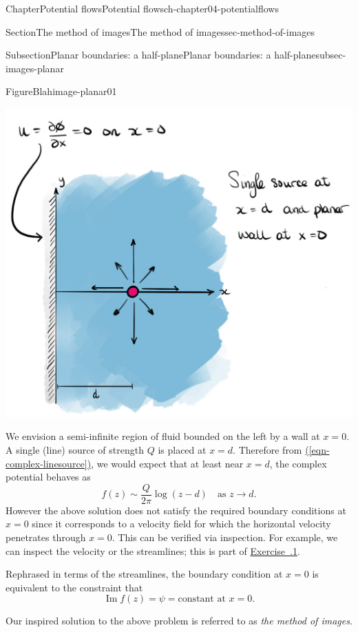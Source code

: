 \documentclass[oneside,10pt,]{book}
\newcommand{\xreffont}{\relax}
\numberwithin{equation}{section}
\renewcommand*{\Im}{\operatorname{Im}}
\begin{document}
\begin{chapterptx}{Chapter}{Potential flows}{}{Potential flows}{}{}{ch-chapter04-potentialflows}
\begin{sectionptx}{Section}{The method of images}{}{The method of images}{}{}{sec-method-of-images}
\begin{subsectionptx}{Subsection}{Planar boundaries: a half-plane}{}{Planar boundaries: a half-plane}{}{}{subsec-images-planar}
\begin{figureptx}{Figure}{Blah}{image-planar01}{}
\begin{image}{0.1}{0.8}{0.1}{}
\includegraphics[width=\linewidth]{external/image-planar01.jpg}
\end{image}%
\tcblower
\end{figureptx}%
We envision a semi-infinite region of fluid bounded on the left by a wall at \(x = 0\). A single (line) source of strength \(Q\) is placed at \(x = d\). Therefore from \hyperref[eqn-complex-linesource]{({\xreffont\ref{eqn-complex-linesource}})}, we would expect that at least near \(x = d\), the complex potential behaves as%
\begin{equation*}
f(z) \sim \frac{Q}{2\pi} \log (z-d) \quad \text{as $z \to d$}.
\end{equation*}
However the above solution does not satisfy the required boundary conditions at \(x = 0\) since it corresponds to a velocity field for which the horizontal velocity penetrates through \(x = 0\). This can be verified via inspection. For example, we can inspect the velocity or the streamlines; this is part of \hyperlink{ps-image-planar01}{Exercise~{\xreffont 4.6.1}}.%
\par
Rephrased in terms of the streamlines, the boundary condition at \(x = 0\) is equivalent to the constraint that%
\begin{equation*}
\Im f(z) = \psi = \textrm{constant at $x = 0$}.
\end{equation*}
%
\par
Our inspired solution to the above problem is referred to as \emph{the method of images}.%

\end{subsectionptx}
\end{sectionptx}
\end{chapterptx}
\end{document}
